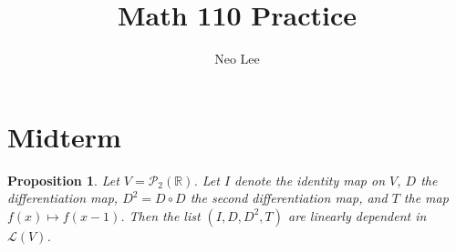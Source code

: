 \documentclass{article}
\title{Math 110 Practice}
\author{Neo Lee}
\date{}
\newtheorem{proposition}[thm]{Proposition}
\begin{document}
 

\maketitle 

\section*{Midterm}
\begin{proposition}
    Let $V=\mathcal{P}_2(\mathbb{R})$. Let $I$ denote the identity map on $V$, $D$ the 
    differentiation map, $D^2=D\circ D$ the second differentiation map, and $T$ the map 
    $f(x)\mapsto f(x-1)$. Then the list $(I, D, D^2, T)$ are linearly dependent in $\mathcal{L}(V)$.
\end{proposition}
\end{document}
